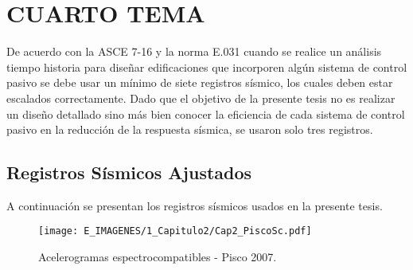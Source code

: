 \section{CUARTO TEMA}

De acuerdo con la ASCE 7-16 y la norma E.031 cuando se realice un análisis tiempo historia para diseñar edificaciones que incorporen algún sistema de control pasivo se debe usar un mínimo de siete registros sísmico, los cuales deben estar escalados correctamente. Dado que el objetivo de la presente tesis no es realizar un diseño detallado sino más bien conocer la eficiencia de cada sistema de control pasivo en la reducción de la respuesta sísmica, se usaron solo tres registros.

\subsection{Registros Sísmicos Ajustados}

A continuación se presentan los registros sísmicos usados en la presente tesis.

\begin{figure}[h!]
	\centering
	\texttt{[image: E\_IMAGENES/1\_Capitulo2/Cap2\_PiscoSc.pdf]}
	\vspace{-8 mm}
	\caption[Acelerogramas espectrocompatibles - Pisco 2007]{\centering\footnotesize Acelerogramas espectrocompatibles - Pisco 2007.}
	\label{Cap2_Figura15}
\end{figure}
